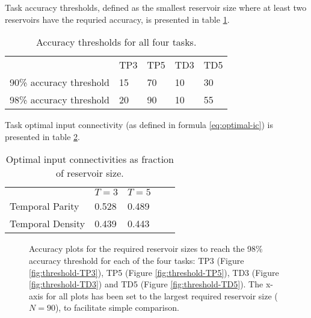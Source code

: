 Task accuracy thresholds,
defined as the smallest reservoir size where at least two reservoirs have the requried accuracy,
is presented in table \ref{tab:accuracy-thresholds}.

\begin{table}[ht]
    \centering
    \caption{Accuracy thresholds for all four tasks.}
    \label{tab:accuracy-thresholds}
    \begin{tabular}{lllll}
                     & TP3 & TP5 & TD3 & TD5 \\
    90\% accuracy threshold & 15  & 70  & 10  & 30  \\
    98\% accuracy threshold & 20  & 90 & 10  & 55
    \end{tabular}
\end{table}

Task optimal input connectivity (as defined in formula \ref{eq:optimal-ic}) is presented in table \ref{tab:optimal-ic}.

\begin{table}[h]
	\centering
	\caption{Optimal input connectivities as fraction of reservoir size.}
	\label{tab:optimal-ic}
	\begin{tabular}{lllll}
						 & $T=3$  & $T=5$ \\
        Temporal Parity  & 0.528          & 0.489         \\
        Temporal Density & 0.439          & 0.443
	\end{tabular}
\end{table}

\begin{figure}[ht]
    \centering
    \caption{
        Accuracy plots for the required reservoir sizes to reach the 98\% accuracy threshold for each of the four tasks:
        TP3 (Figure \ref{fig:threshold-TP3}), TP5 (Figure \ref{fig:threshold-TP5}), TD3 (Figure \ref{fig:threshold-TD3}) and TD5 (Figure \ref{fig:threshold-TD5}).
        The x-axis for all plots has been set to the largest required reservoir size ($N=90$), to facilitate simple comparison.
    }
    \label{fig:accuracy-threshold-size}
    \resizebox{\textwidth}{!}{
        \subfloat[TP3, N=20]{
            
            \label{fig:threshold-TP3}
        }
        \subfloat[TP5, N=90]{
            
            \label{fig:threshold-TP5}
        }
    }
    \resizebox{\textwidth}{!}{
        \subfloat[TD3, N=10]{
            
            \label{fig:threshold-TD3}
        }
        \subfloat[TD5, N=55]{
            
            \label{fig:threshold-TD5}
        }
    }
\end{figure}


